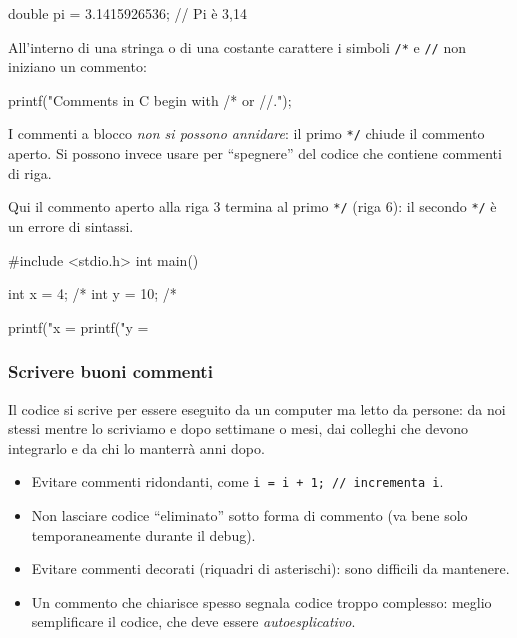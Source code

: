 \documentclass[11pt,a4paper]{article}
\begin{document}
\begin{codice}
double pi = 3.1415926536;   // Pi è 3,14
\end{codice}

All'interno di una stringa o di una costante carattere i simboli \lstinline|/*| e
\lstinline|//| non iniziano un commento:
\begin{codice}
printf("Comments in C begin with /* or //.\n");
\end{codice}

\begin{osservazione}
I commenti a blocco \emph{non si possono annidare}: il primo \lstinline|*/|
chiude il commento aperto. Si possono invece usare per ``spegnere'' del codice
che contiene commenti di riga.
\end{osservazione}

\begin{esempio}
Qui il commento aperto alla riga 3 termina al primo \lstinline|*/| (riga 6): il
secondo \lstinline|*/| è un errore di sintassi.
\begin{codice}
#include <stdio.h>
int main() {
    int x = 4; /*
    int y = 10; /*

    printf("x = %
    printf("y = %
}
\end{codice}
\end{esempio}

\subsubsection{Scrivere buoni commenti}

Il codice si scrive per essere eseguito da un computer ma letto da persone:
da noi stessi mentre lo scriviamo e dopo settimane o mesi, dai colleghi che
devono integrarlo e da chi lo manterrà anni dopo.
\begin{itemize}
    \item Evitare commenti ridondanti, come \lstinline|i = i + 1; // incrementa i|.
    \item Non lasciare codice ``eliminato'' sotto forma di commento (va bene
          solo temporaneamente durante il debug).
    \item Evitare commenti decorati (riquadri di asterischi): sono difficili da
          mantenere.
    \item Un commento che chiarisce spesso segnala codice troppo complesso:
          meglio semplificare il codice, che deve essere \emph{autoesplicativo}.
\end{itemize}
\end{document}
